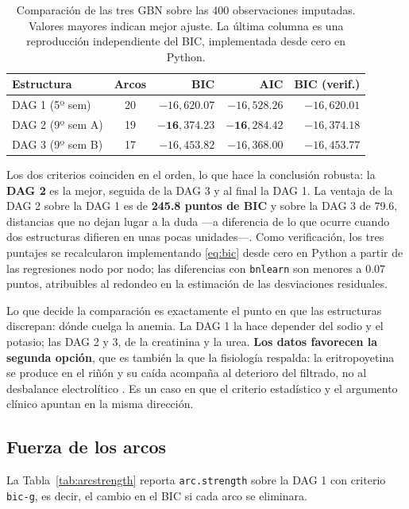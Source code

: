 \documentclass[11pt, a4paper]{article}
\begin{document}
\begin{table}[H]
\centering
\caption{Comparación de las tres GBN sobre las 400 observaciones imputadas. Valores mayores
indican mejor ajuste. La última columna es una reproducción independiente del BIC, implementada
desde cero en Python.}
\label{tab:scores}
\small
\renewcommand{\arraystretch}{1.15}
\begin{tabular}{l c r r r}
\toprule
\textbf{Estructura} & \textbf{Arcos} & \textbf{BIC} & \textbf{AIC} & \textbf{BIC (verif.)} \\
\midrule
DAG 1 (5º sem)   & 20 & $-16{,}620.07$ & $-16{,}528.26$ & $-16{,}620.01$ \\
DAG 2 (9º sem A) & 19 & $\mathbf{-16{,}374.23}$ & $\mathbf{-16{,}284.42}$ & $-16{,}374.18$ \\
DAG 3 (9º sem B) & 17 & $-16{,}453.82$ & $-16{,}368.00$ & $-16{,}453.77$ \\
\bottomrule
\end{tabular}
\end{table}

Los dos criterios coinciden en el orden, lo que hace la conclusión robusta: la \textbf{DAG 2} es
la mejor, seguida de la DAG 3 y al final la DAG 1. La ventaja de la DAG 2 sobre la DAG 1 es de
\textbf{245.8 puntos de BIC} y sobre la DAG 3 de 79.6, distancias que no dejan lugar a la duda —a
diferencia de lo que ocurre cuando dos estructuras difieren en unas pocas unidades—. Como
verificación, los tres puntajes se recalcularon implementando \eqref{eq:bic} desde cero en Python
a partir de las regresiones nodo por nodo; las diferencias con \texttt{bnlearn} son menores a
$0.07$ puntos, atribuibles al redondeo en la estimación de las desviaciones residuales.

Lo que decide la comparación es exactamente el punto en que las estructuras discrepan: dónde
cuelga la anemia. La DAG 1 la hace depender del sodio y el potasio; las DAG 2 y 3, de la
creatinina y la urea. \textbf{Los datos favorecen la segunda opción}, que es también la que la
fisiología respalda: la eritropoyetina se produce en el riñón y su caída acompaña al deterioro del
filtrado, no al desbalance electrolítico \cite{babitt2012}. Es un caso en que el criterio
estadístico y el argumento clínico apuntan en la misma dirección.

\subsection{Fuerza de los arcos}

La Tabla~\ref{tab:arcstrength} reporta \texttt{arc.strength} sobre la DAG 1 con criterio
\texttt{bic-g}, es decir, el cambio en el BIC si cada arco se eliminara.
\end{document}
